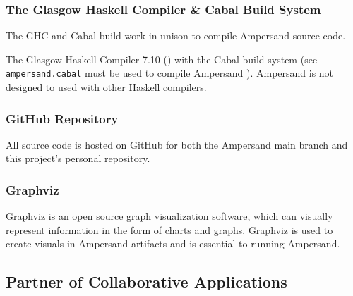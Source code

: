 \documentclass[12pt]{report}
\begin{document}

\subsubsection*{The Glasgow Haskell Compiler \& Cabal Build System}
The GHC and Cabal build work in unison to compile Ampersand source code. 


The Glasgow Haskell Compiler 7.10 (\cite{GHC}) with the Cabal build 
system (see \verb|ampersand.cabal| must be used to compile Ampersand 
\cite{ampSource}). Ampersand is not designed to used with other Haskell 
compilers. 


\subsubsection*{GitHub Repository}
All source code is hosted on GitHub for both the Ampersand main branch and this 
project's personal repository.

\subsubsection*{Graphviz}
Graphviz is an open source graph visualization software, which can
visually represent information in the form of charts and graphs. Graphviz is 
used to create visuals in Ampersand artifacts and is essential to running 
Ampersand.


\subsection{Partner of Collaborative Applications}

\end{document}
